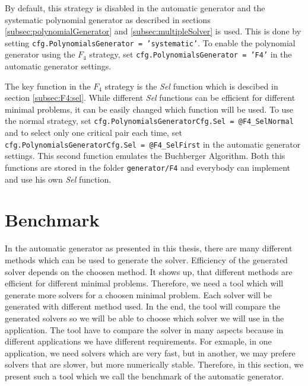 By default, this strategy is disabled in the automatic generator and the systematic polynomial generator as described in sections \ref{subsec:polynomialGenerator} and \ref{subsec:multipleSolver} is used. This is done by setting \texttt{cfg.PolynomialsGenerator = 'systematic'}. To enable the polynomial generator using the $F_4$ strategy, set \texttt{cfg.PolynomialsGenerator = 'F4'} in the automatic generator settings.

The key function in the $F_4$ strategy is the \textit{Sel} function which is descibed in section \ref{subsec:F4:sel}. While different \textit{Sel} functions can be efficient for different minimal problems, it can be easily changed which function will be used. To use the normal strategy, set \texttt{cfg.PolynomialsGeneratorCfg.Sel = @F4\_SelNormal} and to select only one critical pair each time, set \texttt{cfg.PolynomialsGeneratorCfg.Sel = @F4\_SelFirst} in the automatic generator settings. This second function emulates the Buchberger Algorithm. Both this functions are stored in the folder \texttt{generator/F4} and everybody can implement and use his own \textit{Sel} function.

\section{Benchmark}
In the automatic generator as presented in this thesis, there are many different methods which can be used to generate the solver. Efficiency of the generated solver depends on the choosen method. It shows up, that different methods are efficient for different minimal problems. Therefore, we need a tool which will generate more solvers for a choosen minimal problem. Each solver will be generated with different method used. In the end, the tool will compare the generated solvers so we will be able to choose which solver we will use in the application. The tool have to compare the solver in many aspects because in different applications we have different requirements. For exmaple, in one application, we need solvers which are very fast, but in another, we may prefere solvers that are slower, but more numerically stable. Therefore, in this section, we present such a tool which we call the benchmark of the automatic generator.
